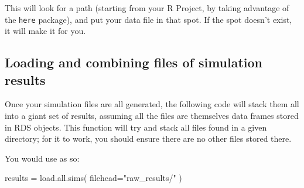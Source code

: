 \documentclass[
]{book}
\newenvironment{Shaded}{\begin{snugshade}}{\end{snugshade}}
\newcommand{\AttributeTok}[1]{\textcolor[rgb]{0.77,0.63,0.00}{#1}}
\newcommand{\ConstantTok}[1]{\textcolor[rgb]{0.00,0.00,0.00}{#1}}
\newcommand{\ControlFlowTok}[1]{\textcolor[rgb]{0.13,0.29,0.53}{\textbf{#1}}}
\newcommand{\FunctionTok}[1]{\textcolor[rgb]{0.00,0.00,0.00}{#1}}
\newcommand{\NormalTok}[1]{#1}
\newcommand{\OtherTok}[1]{\textcolor[rgb]{0.56,0.35,0.01}{#1}}
\newcommand{\SpecialCharTok}[1]{\textcolor[rgb]{0.00,0.00,0.00}{#1}}
\newcommand{\StringTok}[1]{\textcolor[rgb]{0.31,0.60,0.02}{#1}}
\begin{document}
This will look for a path (starting from your R Project, by taking advantage of the \texttt{here} package), and put your data file in that spot.
If the spot doesn't exist, it will make it for you.

\hypertarget{loading-and-combining-files-of-simulation-results}{%
\subsection{Loading and combining files of simulation results}\label{loading-and-combining-files-of-simulation-results}}

Once your simulation files are all generated, the following code will stack them all into a giant set of results, assuming all the files are themselves data frames stored in RDS objects.
This function will try and stack all files found in a given directory; for it to work, you should ensure there are no other files stored there.

\begin{Shaded}
\end{Shaded}

You would use as so:

\begin{Shaded}
\begin{Highlighting}[]
\NormalTok{results }\OtherTok{=} \FunctionTok{load.all.sims}\NormalTok{( }\AttributeTok{filehead=}\StringTok{"raw\_results/"}\NormalTok{ )}
\end{Highlighting}
\end{Shaded}
\end{document}
